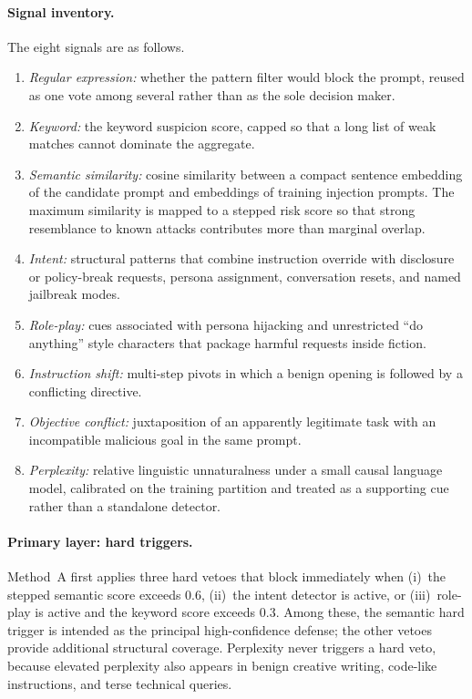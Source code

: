 \documentclass{article}
\begin{document}
\paragraph{Signal inventory.}
The eight signals are as follows.
\begin{enumerate}
  \item \emph{Regular expression:} whether the pattern filter would block the prompt, reused as one vote among several rather than as the sole decision maker.
  \item \emph{Keyword:} the keyword suspicion score, capped so that a long list of weak matches cannot dominate the aggregate.
  \item \emph{Semantic similarity:} cosine similarity between a compact sentence embedding of the candidate prompt and embeddings of training injection prompts.
    The maximum similarity is mapped to a stepped risk score so that strong resemblance to known attacks contributes more than marginal overlap.
  \item \emph{Intent:} structural patterns that combine instruction override with disclosure or policy-break requests, persona assignment, conversation resets, and named jailbreak modes.
  \item \emph{Role-play:} cues associated with persona hijacking and unrestricted ``do anything'' style characters that package harmful requests inside fiction.
  \item \emph{Instruction shift:} multi-step pivots in which a benign opening is followed by a conflicting directive.
  \item \emph{Objective conflict:} juxtaposition of an apparently legitimate task with an incompatible malicious goal in the same prompt.
  \item \emph{Perplexity:} relative linguistic unnaturalness under a small causal language model, calibrated on the training partition and treated as a supporting cue rather than a standalone detector.
\end{enumerate}

\paragraph{Primary layer: hard triggers.}
Method~A first applies three hard vetoes that block immediately when
(i)~the stepped semantic score exceeds 0.6,
(ii)~the intent detector is active, or
(iii)~role-play is active and the keyword score exceeds 0.3.
Among these, the semantic hard trigger is intended as the principal high-confidence defense; the other vetoes provide additional structural coverage.
Perplexity never triggers a hard veto, because elevated perplexity also appears in benign creative writing, code-like instructions, and terse technical queries.
\end{document}
